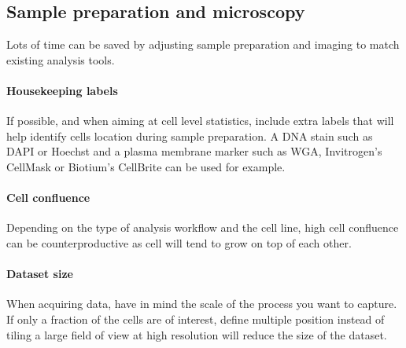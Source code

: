 \subsection{Sample preparation and microscopy}

Lots of time can be saved by adjusting sample preparation and imaging to match existing  analysis tools.

\paragraph{Housekeeping labels} If possible, and when aiming at cell level statistics, include extra labels that will help identify cells location during sample preparation. A DNA stain such as DAPI or Hoechst and a plasma membrane marker such as WGA, Invitrogen's CellMask or Biotium's CellBrite can be used for example.

\paragraph{Cell confluence} Depending on the type of analysis workflow and the cell line, high cell confluence can be counterproductive as cell will tend to grow on top of each other.

\paragraph{Dataset size} When acquiring data, have in mind the scale of the process you want to capture. If only a fraction of the cells are of interest, define multiple position instead of tiling a large field of view at high resolution will reduce the size of the dataset.





